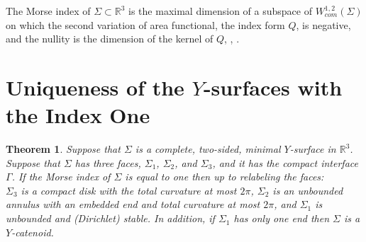 \documentclass[11pt]{amsart}
\numberwithin{equation}{section}
\theoremstyle{theorem}
\newtheorem{theorem}{Theorem}[section]
\theoremstyle{definition}
\numberwithin{equation}{section}
\begin{document}
\label{def: Morse Index} The Morse index of $\Sigma \subset \mathbb{R}^3$ is the maximal dimension of a subspace of $ W_{com}^{1,2} (\Sigma)$ on which the second variation of area functional, the index form $Q$, is negative, and the nullity is the dimension of the kernel of $Q$, \cite{wang2022curvature}, \cite{matinpour2024morse}.

	   

\section{Uniqueness of the $Y$-surfaces with the Index One}\label{sec: main result}
\begin{theorem} \label{thm: main thm}
          Suppose that $\Sigma$ is a complete, two-sided, minimal $Y$-surface in $\mathbb{R}^3$. Suppose that $\Sigma$ has three faces, $\Sigma_1$, $\Sigma_2$, and $\Sigma_3$, and it has the compact interface $\Gamma$. If the Morse index of $\Sigma$ is equal to one then up to relabeling the faces:\\
          $\Sigma_3$ is a compact disk with the total curvature at most $2\pi$, $\Sigma_2$ is an unbounded annulus with an embedded end and total curvature at most $2\pi$, and $\Sigma_1$ is unbounded and (Dirichlet) stable.
          In addition, if $\Sigma_1$ has only one end then $\Sigma$ is a $Y$-catenoid.
        
\end{theorem}
\end{document}

